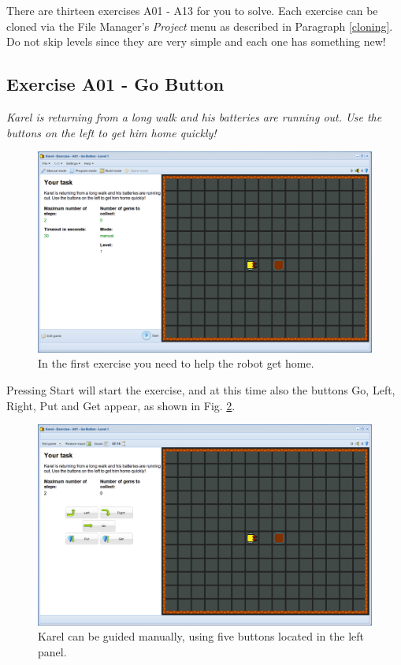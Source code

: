 There are thirteen exercises A01 - A13 for you to solve.
Each exercise can be cloned via the File Manager's 
{\em Project} menu as described in Paragraph \ref{cloning}. 
Do not skip levels since they are very simple and each one has something new! 

\subsection{Exercise A01 - Go Button}

{\em Karel is returning from a long walk and his batteries are running out. 
Use the buttons on the left to get him home quickly! }

\begin{figure}[!ht]
\begin{center}
\includegraphics[height=0.4\textwidth]{imgk/a01.png}
\end{center}
\vspace{-4mm}
\caption{In the first exercise you need to help the robot get home.}
\label{fig:a01}
\end{figure}
\noindent
Pressing Start will start 
the exercise, and at this time also the buttons Go, Left, Right, Put and Get appear, 
as shown in Fig. \ref{fig:a01b}.


\begin{figure}[!ht]
\begin{center}
\includegraphics[height=0.4\textwidth]{imgk/a01b.png}
\end{center}
\vspace{-4mm}
\caption{Karel can be guided manually, using five buttons located in the left panel.}
\label{fig:a01b}
\end{figure}


